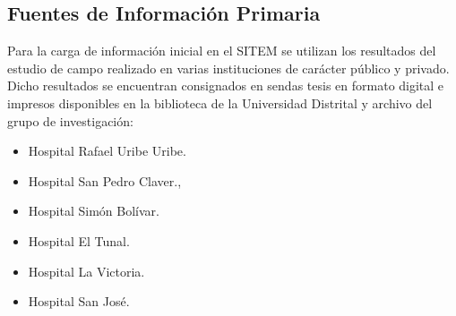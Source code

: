 \subsection {Fuentes de Información Primaria}

Para la carga de información inicial en el SITEM se utilizan los resultados del estudio de campo realizado en varias instituciones de carácter público y privado. Dicho resultados se encuentran consignados en sendas tesis en formato digital e impresos disponibles en la biblioteca de la Universidad Distrital y archivo del grupo de investigación:

\begin{itemize}
 \item Hospital Rafael Uribe Uribe.\cite{guarin2003}
 \item Hospital San Pedro Claver.\cite{ardila2001},\cite{rozo2002}
 \item Hospital Simón Bolívar. \cite{acero2002}
 \item Hospital El Tunal. \cite{ruiz2002}\cite{duque2002}
 \item Hospital La Victoria.\cite{barrero2000}
 \item Hospital San José.\cite{gonzalez2002}
\end{itemize}